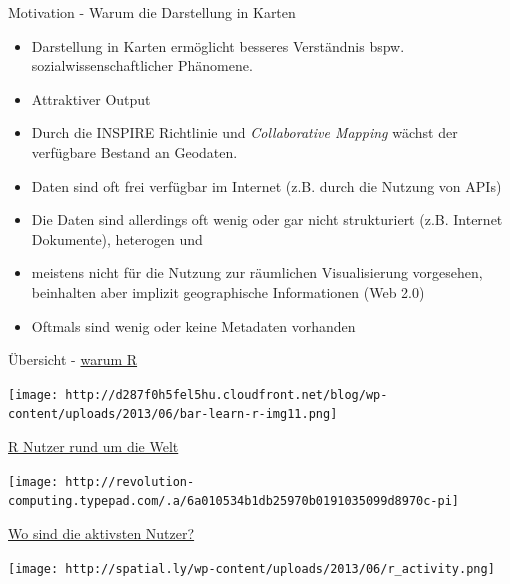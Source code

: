 \documentclass[ignorenonframetext,]{beamer}
\begin{document}
\begin{frame}{Motivation - Warum die Darstellung in Karten}
\protect\hypertarget{motivation---warum-die-darstellung-in-karten}{}

\begin{itemize}
\item
  Darstellung in Karten ermöglicht besseres Verständnis bspw.
  sozialwissenschaftlicher Phänomene.
\item
  Attraktiver Output
\item
  Durch die INSPIRE Richtlinie und \emph{Collaborative Mapping} wächst
  der verfügbare Bestand an Geodaten.
\item
  Daten sind oft frei verfügbar im Internet (z.B. durch die Nutzung von
  APIs)
\item
  Die Daten sind allerdings oft wenig oder gar nicht strukturiert (z.B.
  Internet Dokumente), heterogen und
\item
  meistens nicht für die Nutzung zur räumlichen Visualisierung
  vorgesehen, beinhalten aber implizit geographische Informationen (Web
  2.0)
\item
  Oftmals sind wenig oder keine Metadaten vorhanden
\end{itemize}

\end{frame}

\begin{frame}{Übersicht - \href{http://www.edureka.co/}{warum R}}
\protect\hypertarget{ubersicht---warum-r}{}

\texttt{[image: http://d287f0h5fel5hu.cloudfront.net/blog/wp-content/uploads/2013/06/bar-learn-r-img11.png]}

\end{frame}

\begin{frame}{\href{http://blog.revolutionanalytics.com/}{R Nutzer rund
um die Welt}}
\protect\hypertarget{r-nutzer-rund-um-die-welt}{}

\texttt{[image: http://revolution-computing.typepad.com/.a/6a010534b1db25970b0191035099d8970c-pi]}

\end{frame}

\begin{frame}{\href{http://spatial.ly/}{Wo sind die aktivsten Nutzer?}}
\protect\hypertarget{wo-sind-die-aktivsten-nutzer}{}

\texttt{[image: http://spatial.ly/wp-content/uploads/2013/06/r\_activity.png]}

\end{frame}
\end{document}
